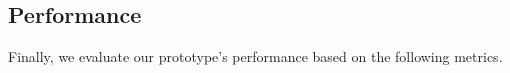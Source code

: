 %
%
%
%

\subsection{Performance}

Finally, we evaluate our prototype's performance based on the following metrics.

